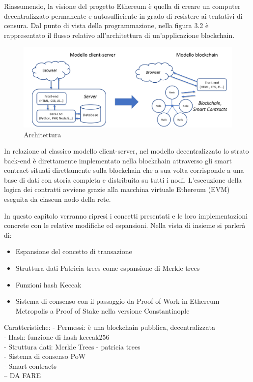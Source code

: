 Riassumendo, la visione del progetto Ethereum è quella di creare un computer decentralizzato permanente e autosufficiente in grado di resistere ai tentativi di censura. Dal punto di vista della programmazione, nella figura 3.2 è rappresentato il flusso relativo all’architettura di un’applicazione blockchain.

\begin{figure}[H]
\centering
\includegraphics[width=1\textwidth]{immagini/architetturav1.png}
\caption{Architettura}
\label{fig:mesh8}
\end{figure}

In relazione al classico modello client-server, nel modello decentralizzato lo strato back-end è direttamente implementato nella blockchain attraverso gli smart contract situati direttamente sulla blockchain che a sua volta corrisponde a una base di dati con storia completa e distribuita su tutti i nodi. L’esecuzione della logica dei contratti avviene grazie alla macchina virtuale Ethereum (EVM) eseguita da ciascun nodo della rete.


In questo capitolo verranno ripresi i concetti presentati e le loro implementazioni concrete con le relative modifiche ed espansioni. Nella vista di insieme si parlerà di:

\begin{itemize}
\item Espansione del concetto di transazione
\item Struttura dati Patricia trees come espansione di Merkle trees
\item Funzioni hash Keccak
\item Sistema di consenso con il passaggio da Proof of Work in Ethereum Metropolis  a Proof of Stake nella versione Constantinople
\end{itemize}

Caratteristiche: 
- Permessi: è una blockchain pubblica, decentralizzata\\
- Hash: funzione di hash keccak256\\
- Struttura dati: Merkle Trees - patricia trees\\
- Sistema di consenso PoW\\
- Smart contracts\\
-- DA FARE\\

